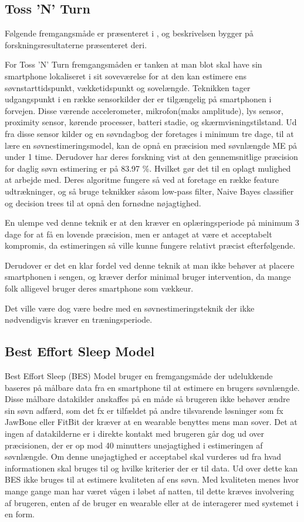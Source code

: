 \subsection{Toss 'N' Turn}
Følgende fremgangsmåde er præsenteret i \cite{Min:2014:TNT:2556288.2557220}, og beskrivelsen bygger på forskningsresultaterne præsenteret deri.

For Toss 'N' Turn fremgangsmåden er tanken at man blot skal have sin smartphone lokaliseret i sit soveværelse for at den kan estimere ens søvnstarttidspunkt, vækketidspunkt og sovelængde.
Teknikken tager udgangspunkt i en række sensorkilder der er tilgængelig på smartphonen i forvejen.
Disse værende accelerometer, mikrofon(maks amplitude), lys sensor, proximity sensor, kørende processer, batteri stadie, og skærmvisningstilstand.
Ud fra disse sensor kilder og en søvndagbog der foretages i minimum tre dage, til at lære en søvnestimeringsmodel, kan de opnå en præcision med søvnlængde ME på under 1 time.
Derudover har deres forskning vist at den gennemsnitlige præcision for daglig søvn estimering er på 83.97 \%. Hvilket gør det til en oplagt mulighed at arbejde med.
Deres algoritme fungere så ved at foretage en række feature udtrækninger, og så bruge teknikker såsom low-pass filter, Naive Bayes classifier og decision trees til at opnå den fornødne nøjagtighed.

En ulempe ved denne teknik er at den kræver en oplæringsperiode på minimum 3 dage for at få en lovende præcision, men er antaget at være et acceptabelt kompromis, da estimeringen så ville kunne fungere relativt præcist efterfølgende.

Derudover er det en klar fordel ved denne teknik at man ikke behøver at placere smartphonen i sengen, og kræver derfor minimal bruger intervention, da mange folk alligevel bruger deres smartphone som vækkeur.

Det ville være dog være bedre med en søvnestimeringsteknik der ikke nødvendigvis kræver en træningsperiode.

\subsection{Best Effort Sleep Model}\label{sec:BES}
Best Effort Sleep (BES) Model \citep{6563918} bruger en fremgangsmåde der udelukkende baseres på målbare data fra en smartphone til at estimere en brugers søvnlængde.
Disse målbare datakilder anskaffes på en måde så brugeren ikke behøver ændre sin søvn adfærd, som det fx er tilfældet på andre tilsvarende løsninger som fx JawBone eller FitBit der kræver at en wearable benyttes mens man sover.
Det at ingen af datakilderne er i direkte kontakt med brugeren går dog ud over præcisionen, der er op mod 40 minutters unøjagtighed i estimeringen af søvnlængde.
Om denne unøjagtighed er acceptabel skal vurderes ud fra hvad informationen skal bruges til og hvilke kriterier der er til data.
Ud over dette kan BES ikke bruges til at estimere kvaliteten af ens søvn.
Med kvaliteten menes hvor mange gange man har været vågen i løbet af natten, til dette kræves involvering af brugeren, enten af de bruger en wearable eller at de interagerer med systemet i en form.

